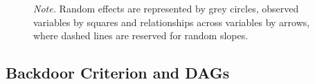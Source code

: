 \documentclass[
  11pt,
  a4paper,
]{article}
\begin{document}
\begin{figure}[H]
\begin{minipage}{0.50\linewidth}
{}

\end{minipage}%
%
\begin{minipage}{0.50\linewidth}



\end{minipage}%
\newline
\begin{minipage}{0.50\linewidth}
\emph{Note.} Random effects are represented by grey circles, observed
variables by squares and relationships across variables by arrows, where
dashed lines are reserved for random slopes.\end{minipage}%

\end{figure}%

\subsection{Backdoor Criterion and
DAGs}\label{backdoor-criterion-and-dags}
\end{document}
